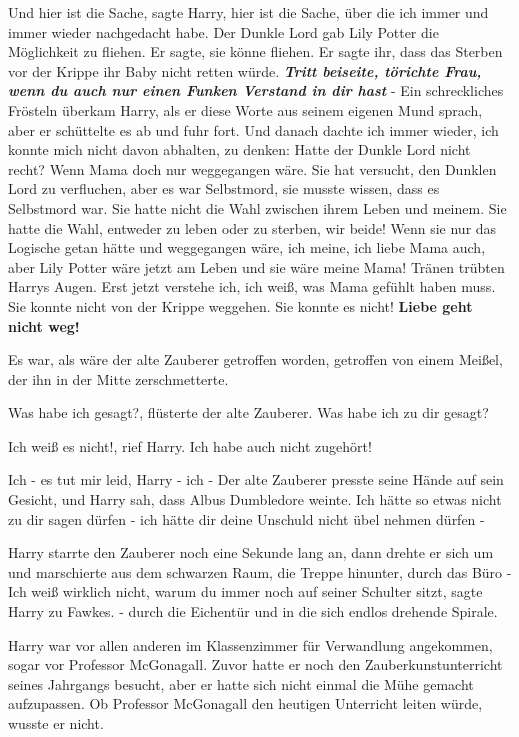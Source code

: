 \glqq{}Und hier ist die Sache\grqq{}, sagte Harry, \glqq{}hier ist die Sache, über
die ich immer und immer wieder nachgedacht habe. Der Dunkle Lord gab Lily Potter
die Möglichkeit zu fliehen. Er sagte, sie könne fliehen. Er sagte ihr, dass das
Sterben vor der Krippe ihr Baby nicht retten würde. \textbf{\emph{Tritt
beiseite, törichte Frau, wenn du auch nur einen Funken Verstand in dir hast
}}-\grqq{} Ein schreckliches Frösteln überkam Harry, als er diese Worte aus
seinem eigenen Mund sprach, aber er schüttelte es ab und fuhr fort. \glqq{}Und
danach dachte ich immer wieder, ich konnte mich nicht davon abhalten, zu denken:
Hatte der Dunkle Lord nicht recht? Wenn Mama doch nur weggegangen wäre. Sie
hat versucht, den Dunklen Lord zu verfluchen, aber es war Selbstmord, sie musste
wissen, dass es Selbstmord war. Sie hatte nicht die Wahl zwischen ihrem Leben
und meinem. Sie hatte die Wahl, entweder zu leben oder zu sterben, wir beide!
Wenn sie nur das Logische getan hätte und weggegangen wäre, ich meine, ich liebe
Mama auch, aber Lily Potter wäre jetzt am Leben und sie wäre meine Mama!\grqq{}
Tränen trübten Harrys Augen. \glqq{}Erst jetzt verstehe ich, ich weiß, was Mama
gefühlt haben muss. Sie konnte nicht von der Krippe weggehen. Sie konnte es
nicht! \textbf{Liebe geht nicht weg!}\grqq{}

Es war, als wäre der alte Zauberer getroffen worden, getroffen von einem Meißel,
der ihn in der Mitte zerschmetterte.

\glqq{}Was habe ich gesagt?\grqq{}, flüsterte der alte Zauberer. \glqq{}Was habe
ich zu dir gesagt?\grqq{}

\glqq{}Ich weiß es nicht!\grqq{}, rief Harry. \glqq{}Ich habe auch nicht
zugehört!\grqq{}

\glqq{}Ich - es tut mir leid, Harry - ich -\grqq{} Der alte Zauberer presste
seine Hände auf sein Gesicht, und Harry sah, dass Albus Dumbledore weinte. \glqq{}
Ich hätte so etwas nicht zu dir sagen dürfen - ich hätte dir deine Unschuld
nicht übel nehmen dürfen -\grqq{}

Harry starrte den Zauberer noch eine Sekunde lang an, dann drehte er sich um und
marschierte aus dem schwarzen Raum, die Treppe hinunter, durch das Büro - \glqq{}
Ich weiß wirklich nicht, warum du immer noch auf seiner Schulter sitzt\grqq{},
sagte Harry zu Fawkes. - durch die Eichentür und in die sich endlos drehende
Spirale.

Harry war vor allen anderen im Klassenzimmer für Verwandlung angekommen, sogar
vor Professor McGonagall. Zuvor hatte er noch den Zauberkunstunterricht seines
Jahrgangs besucht, aber er hatte sich nicht einmal die Mühe gemacht aufzupassen.
Ob Professor McGonagall den heutigen Unterricht leiten würde, wusste er nicht.

